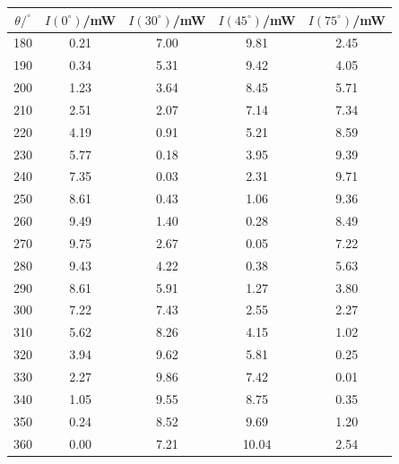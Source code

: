\begin{tabular}{ccccc}
  \toprule
  $\theta/^{\circ}$ & $I(0^{\circ})$/mW & $I(30^{\circ})$/mW & $I(45^{\circ})$/mW & $I(75^{\circ})$/mW \\
  \midrule
  180 & 0.21 & 7.00 & 9.81 & 2.45 \\
  190 & 0.34 & 5.31 & 9.42 & 4.05 \\
  200 & 1.23 & 3.64 & 8.45 & 5.71 \\
  210 & 2.51 & 2.07 & 7.14 & 7.34 \\
  220 & 4.19 & 0.91 & 5.21 & 8.59 \\
  230 & 5.77 & 0.18 & 3.95 & 9.39 \\
  240 & 7.35 & 0.03 & 2.31 & 9.71 \\
  250 & 8.61 & 0.43 & 1.06 & 9.36 \\
  260 & 9.49 & 1.40 & 0.28 & 8.49 \\
  270 & 9.75 & 2.67 & 0.05 & 7.22 \\
  280 & 9.43 & 4.22 & 0.38 & 5.63 \\
  290 & 8.61 & 5.91 & 1.27 & 3.80 \\
  300 & 7.22 & 7.43 & 2.55 & 2.27 \\
  310 & 5.62 & 8.26 & 4.15 & 1.02 \\
  320 & 3.94 & 9.62 & 5.81 & 0.25 \\
  330 & 2.27 & 9.86 & 7.42 & 0.01 \\
  340 & 1.05 & 9.55 & 8.75 & 0.35 \\
  350 & 0.24 & 8.52 & 9.69 & 1.20 \\
  360 & 0.00 & 7.21 & 10.04 & 2.54 \\
  \bottomrule
\end{tabular}